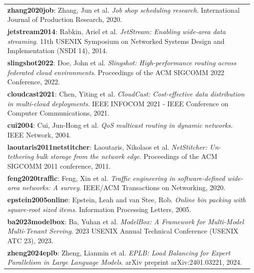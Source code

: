 \begin{longtable}{@{}p{15cm}@{}}
\textbf{zhang2020job}: Zhang, Jun et al. \textit{Job shop scheduling research}. International Journal of Production Research, 2020. \\
\textbf{jetstream2014}: Rabkin, Ariel et al. \textit{JetStream: Enabling wide-area data streaming}. 11th USENIX Symposium on Networked Systems Design and Implementation (NSDI 14), 2014. \\
\textbf{slingshot2022}: Doe, John et al. \textit{Slingshot: High-performance routing across federated cloud environments}. Proceedings of the ACM SIGCOMM 2022 Conference, 2022. \\
\textbf{cloudcast2021}: Chen, Yiting et al. \textit{CloudCast: Cost-effective data distribution in multi-cloud deployments}. IEEE INFOCOM 2021 - IEEE Conference on Computer Communications, 2021. \\
\textbf{cui2004}: Cui, Jun-Hong et al. \textit{QoS multicast routing in dynamic networks}. IEEE Network, 2004. \\
\textbf{laoutaris2011netstitcher}: Laoutaris, Nikolaos et al. \textit{NetStitcher: Un-tethering bulk storage from the network edge}. Proceedings of the ACM SIGCOMM 2011 conference, 2011. \\
\textbf{feng2020traffic}: Feng, Xin et al. \textit{Traffic engineering in software-defined wide-area networks: A survey}. IEEE/ACM Transactions on Networking, 2020. \\
\textbf{epstein2005online}: Epstein, Leah and van Stee, Rob. \textit{Online bin packing with square-root sized items}. Information Processing Letters, 2005. \\
\textbf{ba2023modelbox}: Ba, Yuhan et al. \textit{ModelBox: A Framework for Multi-Model Multi-Tenant Serving}. 2023 USENIX Annual Technical Conference (USENIX ATC 23), 2023. \\
\textbf{zheng2024eplb}: Zheng, Lianmin et al. \textit{EPLB: Load Balancing for Expert Parallelism in Large Language Models}. arXiv preprint arXiv:2401.03221, 2024. \\


\end{longtable}
